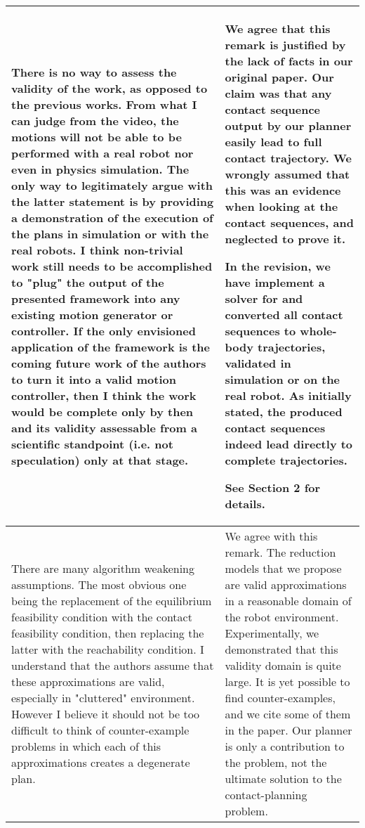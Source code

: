 \documentclass[a4paper]{article}
\begin{document}
\begin{longtable}{|p{21em}|p{21em}|}
\\ \hline %
There is no way to assess the validity of the work, as opposed to the previous works. From what I can judge from the video, the motions will not be able to be performed with a real robot nor even in physics simulation. The only way to legitimately argue with the latter statement is by providing a demonstration of the execution of the plans in simulation or with the real robots. I think non-trivial work still needs to be accomplished to "plug" the output of the presented framework into any existing motion generator or controller. If the only envisioned application of the framework is the coming future work of the authors to turn it into a valid motion controller, then I think the work would be complete only by then and its validity assessable from a scientific standpoint (i.e. not speculation) only at that stage.
&
We agree that this remark is justified by the lack of facts in our original paper.
Our claim was that any contact sequence output by our planner easily lead to full contact trajectory.
We wrongly assumed that this was an evidence when looking at the contact sequences, and neglected to prove it.

In the revision, we have implement a solver for \mP3 and converted all contact sequences to whole-body trajectories, validated in simulation or on the real robot.
As initially stated, the produced contact sequences indeed lead directly to complete trajectories.

See Section 2 for details.

\\ \hline %
There are many algorithm weakening assumptions. The most obvious one being the replacement of the equilibrium feasibility condition with the contact feasibility condition, then replacing the latter with the reachability condition. I understand that the authors assume that these approximations are valid, especially in "cluttered" environment. However I believe it should not be too difficult to think of counter-example problems in which each of this approximations creates a degenerate plan.
&
We agree with this remark. 
The reduction models that we propose are valid approximations in a reasonable domain of the robot environment.
Experimentally, we demonstrated that this validity domain is quite large.
It is yet possible to find counter-examples, and we cite some of them in the paper.
Our planner is only a contribution to the problem, not the ultimate solution to the contact-planning problem.


\end{longtable}
\end{document}
